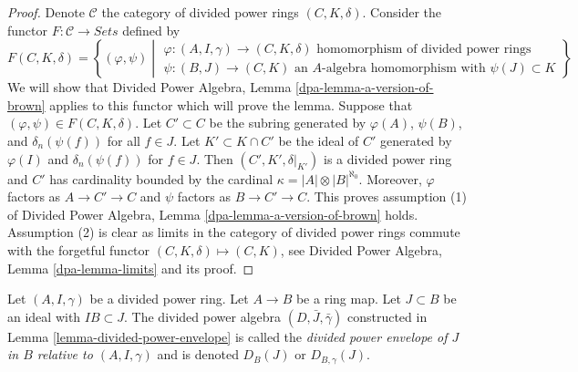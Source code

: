 \begin{proof}
Denote $\mathcal{C}$ the category of divided power rings
$(C, K, \delta)$. Consider the functor
$F : \mathcal{C} \longrightarrow \textit{Sets}$ defined by
$$
F(C, K, \delta) =
\left\{
(\varphi, \psi)
\middle|
\begin{matrix}
\varphi : (A, I, \gamma) \to (C, K, \delta)
\text{ homomorphism of divided power rings} \\
\psi : (B, J) \to (C, K)\text{ an }
A\text{-algebra homomorphism with }\psi(J) \subset K
\end{matrix}
\right\}
$$
We will show that
Divided Power Algebra, Lemma \ref{dpa-lemma-a-version-of-brown}
applies to this functor which will
prove the lemma. Suppose that $(\varphi, \psi) \in F(C, K, \delta)$.
Let $C' \subset C$ be the subring generated by $\varphi(A)$,
$\psi(B)$, and $\delta_n(\psi(f))$ for all $f \in J$.
Let $K' \subset K \cap C'$ be the ideal of $C'$ generated by
$\varphi(I)$ and $\delta_n(\psi(f))$ for $f \in J$.
Then $(C', K', \delta|_{K'})$ is a divided power ring and
$C'$ has cardinality bounded by the cardinal
$\kappa = |A| \otimes |B|^{\aleph_0}$.
Moreover, $\varphi$ factors as $A \to C' \to C$ and $\psi$ factors
as $B \to C' \to C$. This proves assumption (1) of
Divided Power Algebra, Lemma \ref{dpa-lemma-a-version-of-brown}
holds. Assumption (2) is clear
as limits in the category of divided power rings commute with the
forgetful functor $(C, K, \delta) \mapsto (C, K)$, see
Divided Power Algebra, Lemma \ref{dpa-lemma-limits} and its proof.
\end{proof}

\begin{definition}
\label{definition-divided-power-envelope}
Let $(A, I, \gamma)$ be a divided power ring.
Let $A \to B$ be a ring map. Let $J \subset B$ be an ideal
with $IB \subset J$. The divided power algebra $(D, \bar J, \bar\gamma)$
constructed in Lemma \ref{lemma-divided-power-envelope}
is called the {\it divided power envelope of $J$ in $B$
relative to $(A, I, \gamma)$} and is denoted $D_B(J)$ or $D_{B, \gamma}(J)$.
\end{definition}

